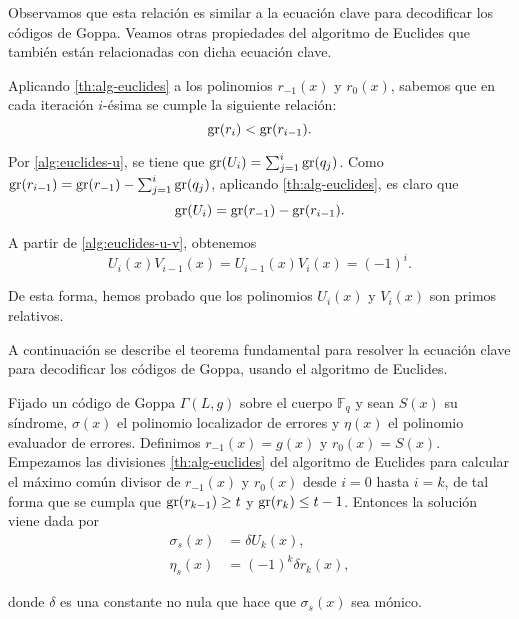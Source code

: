 Observamos que esta relación es similar a la ecuación clave para decodificar los códigos de Goppa. Veamos otras propiedades del algoritmo de Euclides que también están relacionadas con dicha ecuación clave.

Aplicando \ref{th:alg-euclides} a los polinomios $r_{-1}(x)$ y $r_0(x)$, sabemos que en cada iteración $i$-ésima se cumple la siguiente relación:
\begin{equation}
    \label{prop:euclides-grados}
    \operatorname{gr}(r_i) < \operatorname{gr}(r_{i-1}).
\end{equation}

Por \eqref{alg:euclides-u}, se tiene que $\operatorname{gr}(U_i) = \sum_{j=1}^i \operatorname{gr}(q_j)$. Como $\operatorname{gr}(r_{i-1}) = \operatorname{gr}(r_{-1}) - \sum_{j=1}^i \operatorname{gr}(q_j)$, aplicando \ref{th:alg-euclides}, es claro que
\begin{equation}
    \label{prop:euclides-grado-u}
    \operatorname{gr}(U_i) = \operatorname{gr}(r_{-1}) - \operatorname{gr}(r_{i-1}).
\end{equation}

A partir de \eqref{alg:euclides-u-v}, obtenemos
\begin{equation}
    \label{prop:euclides-primos-rel}
    U_i(x) V_{i-1}(x) = U_{i-1}(x) V_i(x) = (-1)^i.
\end{equation}

De esta forma, hemos probado que los polinomios $U_i(x)$ y $V_i(x)$ son primos relativos.

A continuación se describe el teorema fundamental para resolver la ecuación clave para decodificar los códigos de Goppa, usando el algoritmo de Euclides.

\begin{theorem}
    \label{th:alg-Sugiyama}
    Fijado un código de Goppa $\Gamma(L, g)$ sobre el cuerpo $\mathbb{F}_q$ y sean $S(x)$ su síndrome, $\sigma(x)$ el polinomio localizador de errores y $\eta(x)$ el polinomio evaluador de errores. Definimos $r_{-1}(x) = g(x)$ y $r_0(x) = S(x)$. Empezamos las divisiones \ref{th:alg-euclides} del algoritmo de Euclides para calcular el máximo común divisor de $r_{-1}(x)$ y $r_0(x)$ desde $i = 0$ hasta $i = k$, de tal forma que se cumpla que $\operatorname{gr}(r_{k-1}) \geq t$ y $\operatorname{gr}(r_k) \leq t - 1$. Entonces la solución viene dada por
    \begin{equation}
        \label{th:sol-Goppa}
        \begin{split}
            \sigma_s(x) &= \delta U_k (x), \\
            \eta_s(x) &= (-1)^k \delta r_k(x),
        \end{split}
    \end{equation}

    donde $\delta$ es una constante no nula que hace que $\sigma_s(x)$ sea mónico.
\end{theorem}

